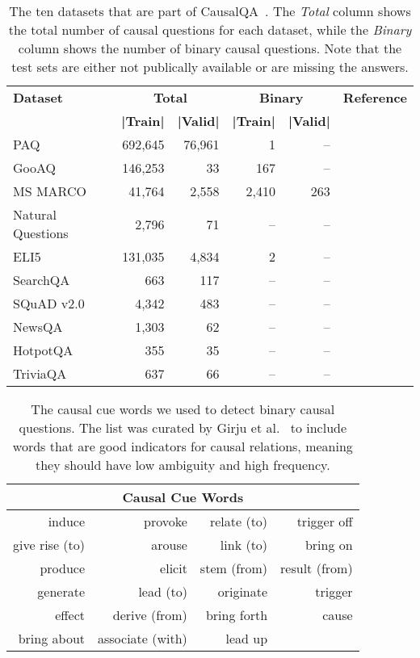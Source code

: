 \begin{table}
\centering
\caption{The ten datasets that are part of CausalQA~\cite{Bondarenko2022CausalQA}. The
		\textit{Total} column shows the total number of causal questions for each dataset, 
		while the \textit{Binary} column shows the number of binary causal questions.
		Note that the test sets are either not publically available or 
		are missing the answers.}
\label{table-causal-datasets}
	\begin{tabular}{lrrrrr} 
		\toprule
		\textbf{Dataset} & \multicolumn{2}{c}{\textbf{Total}} & \multicolumn{2}{c}{\textbf{Binary}} & \textbf{Reference} \\
		\cmidrule(lr{.6em}){2-3} \cmidrule(l{0.4em}){4-5}
		&\textbf{|Train|} & \textbf{|Valid|} & \textbf{|Train|} & \textbf{|Valid|} & \\
		\midrule
		PAQ & 692,645 & 76,961 & 1 & --  & \cite{Lewis2021PAQ}\\ 
		GooAQ & 146,253 & 33 & 167 & -- &  \cite{khashabi:2021}\\
		MS MARCO & 41,764 & 2,558 & 2,410 & 263 & \cite{nguyen:2016} \\
		Natural Questions & 2,796 & 71 & -- & -- & \cite{kwiatkowski:2019}\\
		ELI5 & 131,035 & 4,834 & 2 & --  & \cite{fan:2019}\\
		SearchQA &663 & 117 & -- & -- & \cite{dunn:2017}\\
		SQuAD v2.0 & 4,342 & 483 & -- & -- & \cite{rajpurkar:2018}\\
		NewsQA &1,303 & 62 & -- & -- & \cite{trischler:2017}\\
		HotpotQA &355& 35 & -- & -- & \cite{yang:2018}\\
		TriviaQA & 637 & 66 & -- & -- & \cite{joshi:2017} \\
		\bottomrule
	\end{tabular}
\end{table}
\begin{table}
\caption{The causal cue words we used to detect binary causal questions. The list was
		curated by Girju et al.~\cite{Girju2002CausalCue} to include words that are 
		good indicators for causal relations, meaning they should have low ambiguity and high frequency.}
\label{table-cue-words}
\centering
	\begin{tabular}{rrrr}
	\toprule
	\multicolumn{4}{c}{\textbf{Causal Cue Words}} \\
	\midrule
	induce & provoke & relate (to) & trigger off \\
	give rise (to) & arouse & link (to) & bring on \\
	produce & elicit & stem (from)& result (from)\\
	generate & lead (to)& originate & trigger\\
	effect & derive (from)& bring forth& cause \\
	bring about & associate (with)& lead up &\\
	\bottomrule
	\end{tabular}
\end{table}

